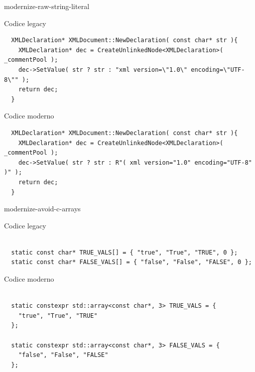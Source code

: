 \documentclass[aspectratio=169]{beamer}
\begin{document}
\begin{frame}[fragile]{modernize-raw-string-literal}
  \vspace{-1em}
  \begin{block}{Codice legacy}
  \begin{lstlisting}
  XMLDeclaration* XMLDocument::NewDeclaration( const char* str ){
    XMLDeclaration* dec = CreateUnlinkedNode<XMLDeclaration>( _commentPool );
    dec->SetValue( str ? str : "xml version=\"1.0\" encoding=\"UTF-8\"" );
    return dec;
  }
  \end{lstlisting}
 \end{block}

 \begin{block}{Codice moderno}
    \begin{lstlisting}
  XMLDeclaration* XMLDocument::NewDeclaration( const char* str ){
    XMLDeclaration* dec = CreateUnlinkedNode<XMLDeclaration>( _commentPool );
    dec->SetValue( str ? str : R"( xml version="1.0" encoding="UTF-8" )" );
    return dec;
  }
    \end{lstlisting}
  \end{block}

\end{frame}



\begin{frame}[fragile]{modernize-avoid-c-arrays}
  \vspace{-1em}
  \begin{block}{Codice legacy}
  \begin{lstlisting}
  
  static const char* TRUE_VALS[] = { "true", "True", "TRUE", 0 };
  static const char* FALSE_VALS[] = { "false", "False", "FALSE", 0 };
  \end{lstlisting}
 \end{block}

 \begin{block}{Codice moderno}
    \begin{lstlisting}
    
  static constexpr std::array<const char*, 3> TRUE_VALS = {
    "true", "True", "TRUE"
  };

  static constexpr std::array<const char*, 3> FALSE_VALS = {
    "false", "False", "FALSE"
  };
    \end{lstlisting}
  \end{block}

\end{frame}
\end{document}
